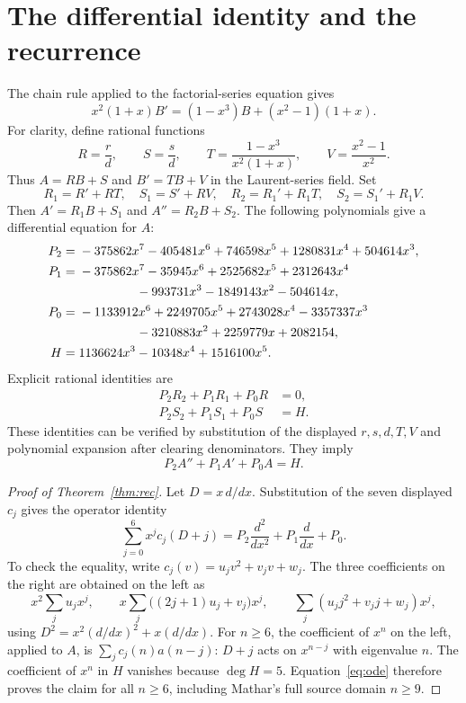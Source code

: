 \documentclass[11pt]{article}
\begin{document}
\section{The differential identity and the recurrence}
The chain rule applied to the factorial-series equation gives
\begin{equation}\label{eq:B}
 x^2(1+x)B'=(1-x^3)B+(x^2-1)(1+x).
\end{equation}
For clarity, define rational functions
\[
 R=\frac r d,\qquad S=\frac s d,\qquad
 T=\frac{1-x^3}{x^2(1+x)},\qquad V=\frac{x^2-1}{x^2}.
\]
Thus $A=RB+S$ and $B'=TB+V$ in the Laurent-series field.
Set
\[
 R_1=R'+RT,\quad S_1=S'+RV,\quad
 R_2=R_1'+R_1T,\quad S_2=S_1'+R_1V.
\]
Then $A'=R_1B+S_1$ and $A''=R_2B+S_2$.
The following polynomials give a differential equation for $A$:
\begin{align*}
 P_2={}&-375862x^7-405481x^6+746598x^5
                         +1280831x^4+504614x^3,\\
 P_1={}&-375862x^7-35945x^6+2525682x^5+2312643x^4\\
       &\hspace{16mm}-993731x^3-1849143x^2-504614x,\\
 P_0={}&-1133912x^6+2249705x^5+2743028x^4-3357337x^3\\
       &\hspace{16mm}-3210883x^2+2259779x+2082154,\\
 H={}&1136624x^3-10348x^4+1516100x^5.
\end{align*}
Explicit rational identities are
\begin{equation}\label{eq:cert}
 \begin{split}
 P_2R_2+P_1R_1+P_0R&=0,\\
 P_2S_2+P_1S_1+P_0S&=H.
 \end{split}
\end{equation}
These identities can be verified by substitution of the displayed
$r,s,d,T,V$ and polynomial expansion after clearing denominators.
They imply
\begin{equation}\label{eq:ode}
 P_2A''+P_1A'+P_0A=H.
\end{equation}

\begin{proof}[Proof of Theorem~\ref{thm:rec}]
Let $D=x\,d/dx$. Substitution of the seven displayed $c_j$ gives the
operator identity
\[
 \sum_{j=0}^6x^jc_j(D+j)
       =P_2\frac{d^2}{dx^2}+P_1\frac{d}{dx}+P_0.
\]
To check the equality, write $c_j(v)=u_jv^2+v_jv+w_j$.
The three coefficients on the right are obtained on the left as
\[
 x^2\sum_j u_jx^j,\qquad
 x\sum_j\bigl((2j+1)u_j+v_j\bigr)x^j,\qquad
 \sum_j(u_jj^2+v_jj+w_j)x^j,
\]
using $D^2=x^2(d/dx)^2+x(d/dx)$.
For $n\geq6$, the coefficient of $x^n$ on the left, applied to $A$,
is $\sum_j c_j(n)a(n-j)$: $D+j$ acts on $x^{n-j}$ with eigenvalue $n$.
The coefficient of $x^n$ in $H$ vanishes because $\deg H=5$.
Equation~\eqref{eq:ode} therefore proves the claim for all $n\geq6$,
including Mathar's full source domain $n\geq9$.
\end{proof}
\end{document}
